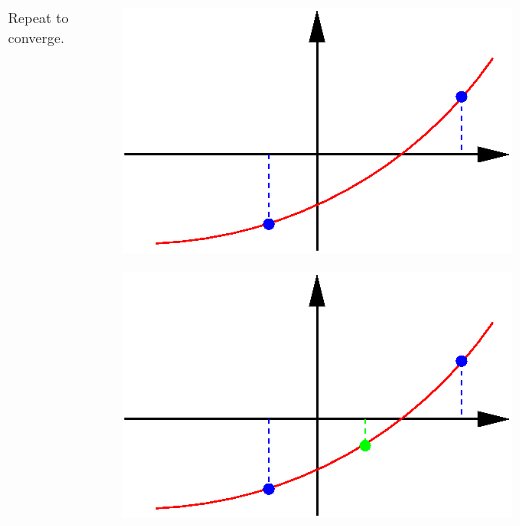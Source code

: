 \documentclass{beamer}
\begin{document}
\begin{frame}
\begin{columns}
\begin{column}{0.5\textwidth}
      Repeat to converge.
    \end{column}
    \begin{column}{0.475\textwidth}
      \begin{overlayarea}{\textwidth}{0.5\textheight}
        {
          \begin{center}
            \includegraphics[width=\textwidth]{figures/Bisection1}
          \end{center}
        }
         {
          \begin{center}
            \includegraphics[width=\textwidth]{figures/Bisection2}
          \end{center}
        }
         {
          \begin{center}

\end{center}}
\end{overlayarea}
\end{column}
\end{columns}
\end{frame}
\end{document}
